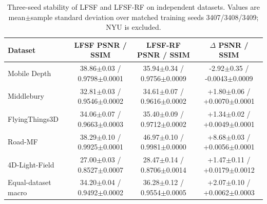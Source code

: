 \begin{table}[t]
\centering
\caption{Three-seed stability of LFSF and LFSF-RF on independent datasets. Values are mean$\pm$sample standard deviation over matched training seeds 3407/3408/3409; NYU is excluded.}
\label{tab:lfsf_rf_seed_stability}
\small
\setlength{\tabcolsep}{7pt}
\renewcommand{\arraystretch}{1.08}
\begin{tabular}{@{}lccc@{}}
\toprule
Dataset & LFSF PSNR / SSIM & LFSF-RF PSNR / SSIM & $\Delta$ PSNR / SSIM \\
\midrule
Mobile Depth & 38.86$\pm$0.03 / 0.9798$\pm$0.0001 & 35.94$\pm$0.34 / 0.9756$\pm$0.0009 & -2.92$\pm$0.35 / -0.0043$\pm$0.0009 \\
Middlebury & 32.81$\pm$0.03 / 0.9546$\pm$0.0002 & 34.61$\pm$0.07 / 0.9616$\pm$0.0002 & +1.80$\pm$0.06 / +0.0070$\pm$0.0001 \\
FlyingThings3D & 34.06$\pm$0.07 / 0.9663$\pm$0.0003 & 35.40$\pm$0.09 / 0.9712$\pm$0.0002 & +1.34$\pm$0.02 / +0.0049$\pm$0.0001 \\
Road-MF & 38.29$\pm$0.10 / 0.9925$\pm$0.0001 & 46.97$\pm$0.10 / 0.9981$\pm$0.0000 & +8.68$\pm$0.03 / +0.0056$\pm$0.0001 \\
4D-Light-Field & 27.00$\pm$0.03 / 0.8527$\pm$0.0007 & 28.47$\pm$0.14 / 0.8706$\pm$0.0014 & +1.47$\pm$0.11 / +0.0179$\pm$0.0012 \\
\midrule
Equal-dataset macro & 34.20$\pm$0.04 / 0.9492$\pm$0.0002 & 36.28$\pm$0.12 / 0.9554$\pm$0.0005 & +2.07$\pm$0.10 / +0.0062$\pm$0.0003 \\
\bottomrule
\end{tabular}
\end{table}
